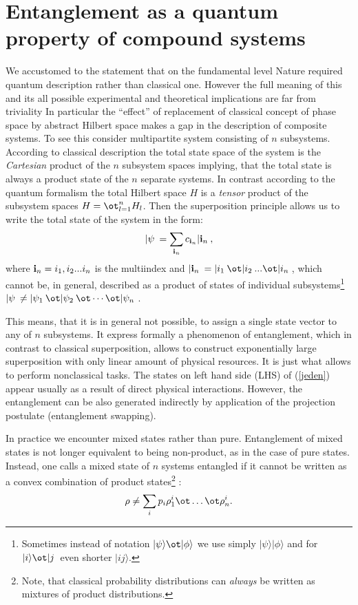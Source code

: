 \documentclass[twocolumn,aps,rmp]{revtex4}
\begin{document}
\section{ Entanglement as a quantum property of compound systems}
\label{sec:ent_as_prop}
We accustomed to the statement that on the fundamental level Nature
required quantum description rather than classical one. However the
full meaning of this and its all possible experimental and theoretical
implications are far from triviality \cite{Jozsa} In particular the
``effect'' of replacement of classical concept of phase space by
abstract Hilbert space makes a gap in the description of composite
systems. To see this consider multipartite system consisting of $n$
subsystems. According to classical description the total state space
of the system is the {\it Cartesian} product of the $n$ subsystem
spaces implying, that the total state is always a product state of the
$n$ separate systems. In contrast according to the quantum formalism the
total Hilbert space $H$ is a {\it tensor} product of the subsystem
spaces $H=\ot ^n_{l=1}H _l$. Then the superposition principle allows
us to write the total state of the system in the form:
\begin{equation}
  | \psi \>  = \sum_{{ \bf i}_n} c_{{ \bf i}_n}|{{ \bf i}_n}\>,
  \label{jeden}
\end{equation}
where ${{ \bf i}_n} = i_1,i_2...i_n$ is the multiindex and $|{{ \bf
    i}_n}\>= |{i_1}\> {\ot} |{i_2}\>...{\ot}|{i_n}\>$, which cannot
be, in general, described as a product of states of individual
subsystems\footnote{Sometimes instead of notation $|\psi\rangle \ot
  |\phi\rangle$ we use simply $|\psi\rangle |\phi\rangle$ and for
  $|i\rangle \ot |j\>$ even shorter $|ij\rangle$.} $| \psi
\>\neq|\psi_{1}\>\ot|\psi_{2}\>\ot \cdots \ot |\psi_{n}\>$.

This means, that it is in general not possible, to assign a single
state vector to any of $n$ subsystems. It express formally a
phenomenon of entanglement, which in contrast to classical
superposition, allows to construct exponentially large superposition
with only linear amount of physical resources. It is just what allows
to perform nonclassical tasks. The states on left hand side (LHS) of
(\ref{jeden}) appear usually as a result of direct physical
interactions. However, the entanglement can be also generated
indirectly by application of the projection postulate (entanglement
swapping).

In practice we encounter mixed states rather than pure. Entanglement
of mixed states is not longer equivalent to being non-product, as in
the case of pure states. Instead, one calls a mixed state of $n$
systems entangled if it cannot be written as a convex combination of
product states\footnote{Note, that classical probability distributions
  can \emph{always} be written as mixtures of product distributions.}
\cite{Werner1989}:
\begin{equation}
\rho\not= \sum_i p_i \rho^i_1 \ot \ldots \ot \rho^i_n.
\end{equation}
\end{document}
